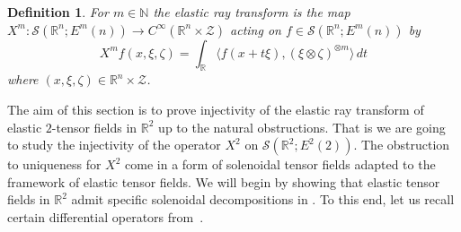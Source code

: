 \documentclass[11pt]{article}
\newcommand{\Sc}{\mathcal{S}}
\newcommand{\Zc}{\mathcal{Z}}
\newcommand{\Rb}{\mathbb{R}}
\newcommand{\inner}[1]{\langle #1 \rangle}
\newtheorem{definition}[theorem]{Definition}
\begin{document}
\begin{definition}
\label{def: new elastic ray transform}
For $m \in \mathbb{N}$ the elastic ray transform  is the map $X^m \colon \mathcal{S}(\mathbb{R}^n;E^m(n)) \to C^\infty(\mathbb{R}^n \times \mathcal{Z})$ acting on $f \in \mathcal{S}(\mathbb{R}^n;E^m(n))$ by
\begin{equation}
X^mf(x,\xi,\zeta)
=
\int_\mathbb{R}
\inner{f(x+t\xi),(\xi \otimes \zeta)^{\otimes m}}
\,dt
\end{equation}
where $(x,\xi,\zeta) \in \mathbb{R}^n \times \mathcal{Z}$.
\end{definition}
\noindent The aim of this section is to prove injectivity of the elastic ray transform of elastic $2$-tensor fields in $\mathbb{R}^2$ up to the natural obstructions. That is we are going to study the injectivity of the operator $X^2$ on $\mathcal{S}(\mathbb{R}^2;E^2(2))$. The obstruction to uniqueness for $X^2$ come in a form of solenoidal tensor fields adapted to the framework of elastic tensor fields. We will begin by showing that elastic tensor fields in $\Rb^2$ admit specific solenoidal decompositions in . To this end, let us recall certain differential operators from~\cite{ilmavirta2025elasticraytransform}.


\end{document}
